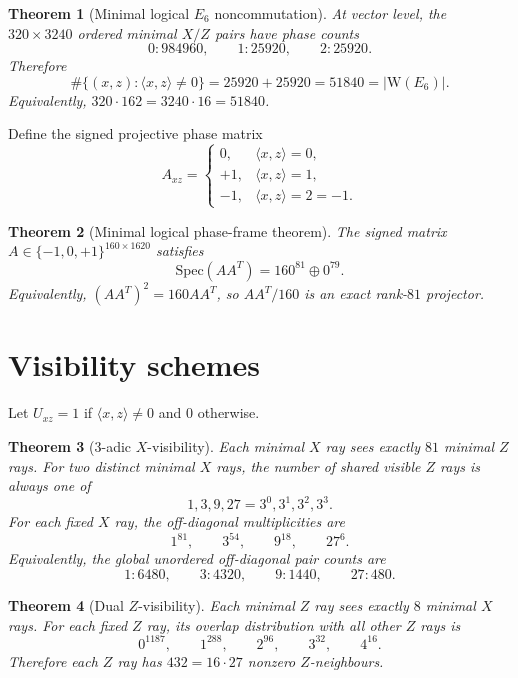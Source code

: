 \documentclass[12pt]{article}
\newtheorem{theorem}{Theorem}[section]
\newcommand{\Weyl}{\mathrm W}
\newcommand{\Spec}{\mathrm{Spec}}
\begin{document}
\begin{theorem}[Minimal logical $E_6$ noncommutation]
At vector level, the $320\times3240$ ordered minimal $X/Z$ pairs have phase counts
\[
        0:984960,
        \qquad
        1:25920,
        \qquad
        2:25920.
\]
Therefore
\[
        \#\{(x,z):\langle x,z\rangle\ne0\}=25920+25920=51840=|\Weyl(E_6)|.
\]
Equivalently, $320\cdot162=3240\cdot16=51840$.
\end{theorem}

Define the signed projective phase matrix
\[
A_{xz}=\begin{cases}
0,&\langle x,z\rangle=0,\\
+1,&\langle x,z\rangle=1,\\
-1,&\langle x,z\rangle=2=-1.
\end{cases}
\]

\begin{theorem}[Minimal logical phase-frame theorem]
The signed matrix $A\in\{-1,0,+1\}^{160\times1620}$ satisfies
\[
        \Spec(AA^T)=160^{81}\oplus0^{79}.
\]
Equivalently, $(AA^T)^2=160AA^T$, so $AA^T/160$ is an exact rank-$81$ projector.
\end{theorem}

\section{Visibility schemes}

Let $U_{xz}=1$ if $\langle x,z\rangle\ne0$ and $0$ otherwise.

\begin{theorem}[$3$-adic $X$-visibility]
Each minimal $X$ ray sees exactly $81$ minimal $Z$ rays.  For two distinct minimal $X$ rays, the number of shared visible $Z$ rays is always one of
\[
        1,3,9,27=3^0,3^1,3^2,3^3.
\]
For each fixed $X$ ray, the off-diagonal multiplicities are
\[
        1^{81},\qquad 3^{54},\qquad 9^{18},\qquad 27^6.
\]
Equivalently, the global unordered off-diagonal pair counts are
\[
        1:6480,
        \qquad
        3:4320,
        \qquad
        9:1440,
        \qquad
        27:480.
\]
\end{theorem}

\begin{theorem}[Dual $Z$-visibility]
Each minimal $Z$ ray sees exactly $8$ minimal $X$ rays.  For each fixed $Z$ ray, its overlap distribution with all other $Z$ rays is
\[
        0^{1187},\qquad 1^{288},\qquad 2^{96},\qquad 3^{32},\qquad 4^{16}.
\]
Therefore each $Z$ ray has $432=16\cdot27$ nonzero $Z$-neighbours.
\end{theorem}
\end{document}
